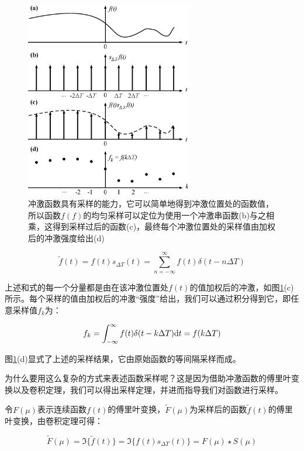 \begin{figure}
	\sidecaption
	\includegraphics[width=0.65\textwidth]{figures/intro/sampling}
	\caption{冲激函数具有采样的能力，它可以简单地得到冲激位置处的函数值，所以函数$f(f)$的均匀采样可以定位为使用一个冲激串函数(b)与之相乘，这得到采样过后的函数(c)，最终每个冲激位置处的采样值由加权后的冲激强度给出(d)}
	\label{f:intro-sampling}
\end{figure}

\begin{equation}
	\tilde{f}(t)=f(t)s_{\Delta T}(t)=\sum^{\infty}_{n=-\infty}f(t)\delta(t-n\Delta T)
\end{equation}

上述和式的每一个分量都是由在该冲激位置处$f(t)$的值加权后的冲激，如图\ref{f:intro-sampling}(c)所示。每个采样的值由加权后的冲激“强度”给出，我们可以通过积分得到它，即任意采样值$f_k$为：

\begin{equation}
	f_k=\int^{\infty}_{-\infty}f(t)\delta(t-k\Delta T){\rm d}t=f(k\Delta T)
\end{equation}

图\ref{f:intro-sampling}(d)显式了上述的采样结果，它由原始函数的等间隔采样而成。

为什么要用这么复杂的方式来表述函数采样呢？这是因为借助冲激函数的傅里叶变换以及卷积定理，我们可以得出采样定理，并进而指导我们对函数进行采样。

令$F(\mu)$表示连续函数$f(t)$的傅里叶变换，$\tilde{F}(\mu)$为采样后的函数$\tilde{f}(t)$的傅里叶变换，由卷积定理可得：

\begin{equation}
	\tilde{F}(\mu)=\Im\{\tilde{f}(t)\}=\Im\{f(t)s_{\Delta T}(t)\}=F(\mu)\star S(\mu)
\end{equation}

